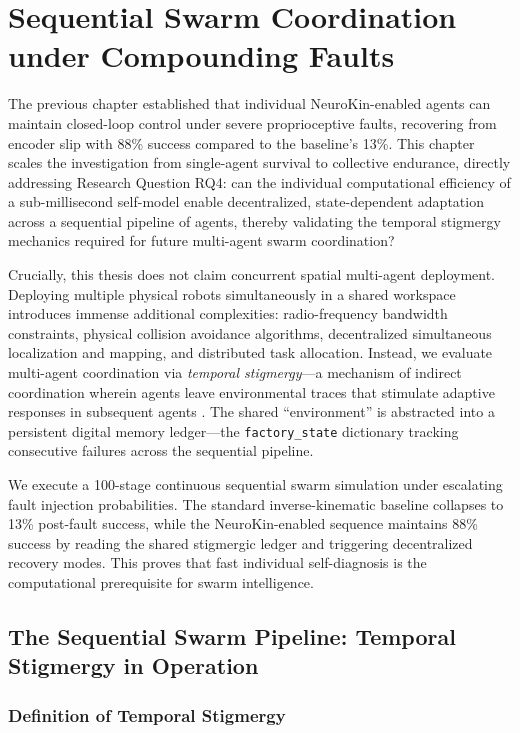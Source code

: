 \documentclass[12pt,a4paper,oneside]{report}
\begin{document}
\chapter{Sequential Swarm Coordination under Compounding Faults}
\label{chap:sequential_swarm_coordination_ch6}

The previous chapter established that individual NeuroKin-enabled agents can maintain closed-loop control under severe proprioceptive faults, recovering from encoder slip with 88\% success compared to the baseline's 13\%. This chapter scales the investigation from single-agent survival to collective endurance, directly addressing Research Question RQ4: can the individual computational efficiency of a sub-millisecond self-model enable decentralized, state-dependent adaptation across a sequential pipeline of agents, thereby validating the temporal stigmergy mechanics required for future multi-agent swarm coordination?

Crucially, this thesis does not claim concurrent spatial multi-agent deployment. Deploying multiple physical robots simultaneously in a shared workspace introduces immense additional complexities: radio-frequency bandwidth constraints, physical collision avoidance algorithms, decentralized simultaneous localization and mapping, and distributed task allocation. Instead, we evaluate multi-agent coordination via \textit{temporal stigmergy}---a mechanism of indirect coordination wherein agents leave environmental traces that stimulate adaptive responses in subsequent agents \cite{bongard2006resilient}. The shared ``environment'' is abstracted into a persistent digital memory ledger---the \texttt{factory\_state} dictionary tracking consecutive failures across the sequential pipeline.

We execute a 100-stage continuous sequential swarm simulation under escalating fault injection probabilities. The standard inverse-kinematic baseline collapses to 13\% post-fault success, while the NeuroKin-enabled sequence maintains 88\% success by reading the shared stigmergic ledger and triggering decentralized recovery modes. This proves that fast individual self-diagnosis is the computational prerequisite for swarm intelligence.

\section{The Sequential Swarm Pipeline: Temporal Stigmergy in Operation}

\subsection{Definition of Temporal Stigmergy}
\end{document}
